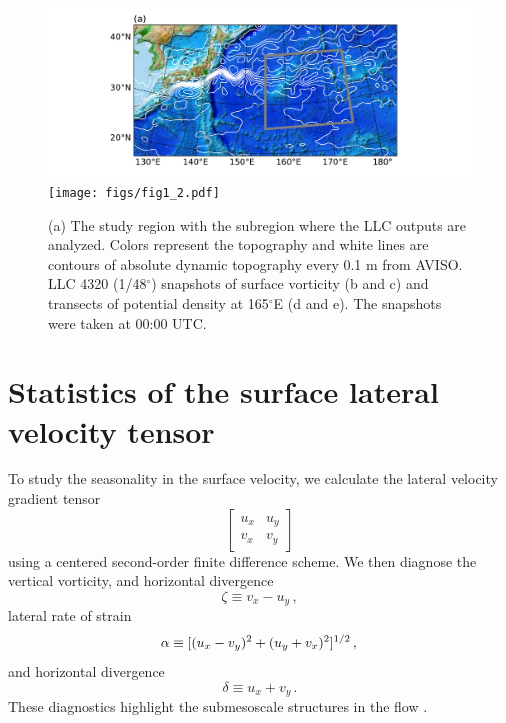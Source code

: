 \documentclass[grl]{agutex2015}
\begin{document}
\begin{article}
\begin{figure}[ht]
\begin{center}
\hspace{-1.25cm}\includegraphics[width=.75\textwidth]{figs/fig1_1.pdf}\\
\vspace{-.125cm}
\texttt{[image: figs/fig1\_2.pdf]}
 \caption{(a) The study region with the subregion where the LLC outputs are
          analyzed. Colors represent the topography and white lines are contours of absolute
          dynamic topography every 0.1 m from AVISO. LLC 4320 (1/48$^\circ$) snapshots of surface vorticity (b and c) and transects
          of potential density at 165$^\circ$E (d and e). The snapshots were
          taken at 00:00 UTC.}
\vspace{-1.5cm}
 \label{fig1}
 \end{center}
 \end{figure}

\section{Statistics of the surface lateral velocity tensor}
To study the seasonality in the surface velocity, we calculate the lateral velocity gradient tensor
\begin{equation}
\left[\begin{matrix} u_x & u_y\\ v_x&v_y \end{matrix}\right]
\end{equation}
using a centered
second-order finite difference scheme. We then diagnose
the vertical vorticity, and horizontal divergence
\begin{equation}
\zeta \equiv v_x - u_y\, ,
\end{equation}
lateral rate of strain
\begin{equation}
  \alpha \equiv [(u_x-v_y)^2 + (u_y + v_x)^2]^{1/2}\,,\\
\end{equation}
and horizontal divergence
\begin{equation}
\delta \equiv u_x + v_y\, .
\end{equation}
These diagnostics highlight the submesoscale structures in the flow
\citep[e.g.,][]{capet_etal2008a,shcherbina_etal2013}.


\end{article}
\end{document}

